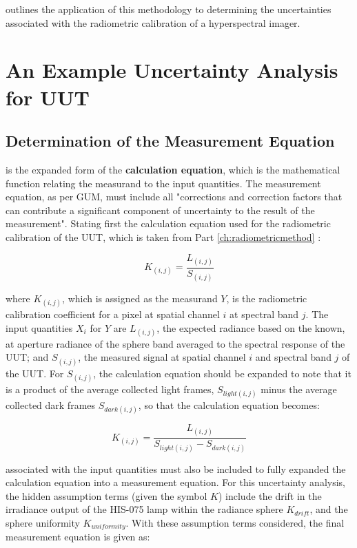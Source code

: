 \documentclass[nohyper,nobib]{tufte-book}
\begin{document}
 outlines the application of this methodology to determining the uncertainties associated with the radiometric calibration of a hyperspectral imager. 

\chapter{An Example Uncertainty Analysis for UUT}
\label{ch:uncertainityanalysis}

\section{Determination of the Measurement Equation}

 is the expanded form of the \textbf{calculation equation}, which is the mathematical function relating the measurand to the input quantities. The measurement equation, as per GUM, must include all "corrections and correction factors that can contribute a significant component of uncertainty to the result of the measurement".  Stating first the calculation equation used for the radiometric calibration of the UUT, which is taken from  Part \ref{ch:radiometricmethod} :

\begin{equation}
	K_{(i, j)} = \frac{L_{(i,j)}}{S_{(i,j)}}
\end{equation}

where $K_{(i, j)}$, which is assigned as the measurand $Y$, is the radiometric calibration coefficient for a pixel at spatial channel $i$ at spectral band $j$. The input quantities $X_{i}$ for $Y$ are $L_{(i,j)}$,  the expected radiance based on the known, at aperture radiance of the sphere band averaged to the spectral response of the UUT; and $S_{(i,j)}$, the measured signal at spatial channel $i$ and spectral band $j$ of the UUT. For $S_{(i,j)}$, the calculation equation should be expanded to note that it is a product of the average collected light frames, $S_{light(i,j)}$ minus the average collected dark frames $S_{dark(i,j)}$, so that the calculation equation becomes:

\begin{equation}
	K_{(i, j)} = \frac{L_{(i,j)}}{S_{light(i,j)} - S_{dark(i,j)}}
\end{equation}

 associated with the input quantities must also be included to fully expanded the calculation equation into a measurement equation. For this uncertainty analysis, the hidden assumption terms (given the symbol $K$) include the drift in the irradiance output of the HIS-075 lamp within the radiance sphere $K_{drift}$, and the sphere uniformity $K_{uniformity}$. With these assumption terms considered, the final measurement equation is given as:
\end{document}
